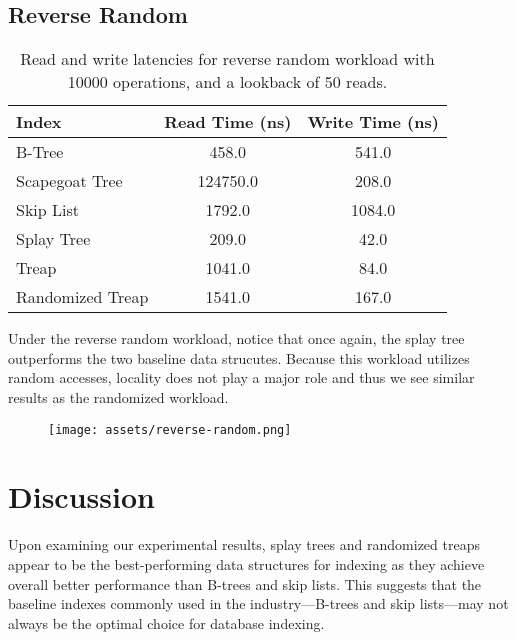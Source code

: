 \documentclass[sigconf]{acmart}
\begin{document}
\subsection{Reverse Random}
\begin{center}
  \begin{table}[H]
    \begin{tabular}{|l|c|c|}
      \hline
      \bf{Index} & \bf{Read Time (ns)} & \bf{Write Time (ns)} \\
      \hline
      B-Tree&458.0&541.0\\
      \hline
      Scapegoat Tree&124750.0&208.0\\
      \hline
      Skip List&1792.0&1084.0\\
      \hline
      Splay Tree&209.0&42.0\\
      \hline
      Treap&1041.0&84.0\\
      \hline
      Randomized Treap&1541.0&167.0\\
      \hline

    \end{tabular}
    \caption{Read and write latencies for reverse random workload with 10000 operations, and a lookback of 50 reads.}
  \end{table}
\end{center}

Under the reverse random workload, notice that once again, the splay tree outperforms the two baseline data strucutes. Because this workload utilizes random accesses, locality does not play a major role and thus we see similar results as the randomized workload.

\begin{center}

\begin{figure}[H]
    \texttt{[image: assets/reverse-random.png]}
\end{figure}
\end{center}
\newpage

\section{Discussion}
Upon examining our experimental results, splay trees and randomized treaps appear to be the best-performing data structures for indexing as they achieve overall better performance than B-trees and skip lists. This suggests that the baseline indexes commonly used in the industry---B-trees and skip lists---may not always be the optimal choice for database indexing.
\end{document}

